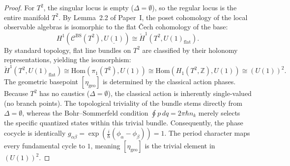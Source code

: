 \documentclass[11pt]{article}
\begin{document}
\begin{proof}
For $T^2$, the singular locus is empty ($\Delta = \emptyset$), so the regular locus is the entire manifold $T^2$.
By Lemma~2.2 of Paper~I, the poset cohomology of the local observable algebras is isomorphic to the flat \v{C}ech cohomology of the base:
\[
  H^1(\mathcal{C}^{\mathrm{BS}}(T^2), \underline{U(1)}) \cong \check{H}^1(T^2, U(1)_{\mathrm{flat}}).
\]
By standard topology, flat line bundles on $T^2$ are classified by their holonomy representations, yielding the isomorphism:
\[
  \check{H}^1(T^2, U(1)_{\mathrm{flat}}) \cong \mathrm{Hom}(\pi_1(T^2), U(1)) \cong \mathrm{Hom}(H_1(T^2, \mathbb{Z}), U(1)) \cong (U(1))^2.
\]
The geometric basepoint $[\eta_{\mathrm{geo}}]$ is determined by the classical action phases. Because $T^2$ has no caustics ($\Delta = \emptyset$), the classical action is inherently single-valued (no branch points). The topological triviality of the bundle stems directly from $\Delta = \emptyset$, whereas the Bohr--Sommerfeld condition $\oint p\,dq = 2\pi\hbar n_k$ merely selects the specific quantized states within this trivial bundle. Consequently, the phase cocycle is identically $g_{\alpha\beta} = \exp(\frac{i}{\hbar}(\phi_\alpha - \phi_\beta)) = 1$. The period character maps every fundamental cycle to $1$, meaning $[\eta_{\mathrm{geo}}]$ is the trivial element in $(U(1))^2$.
\end{proof}
\end{document}

